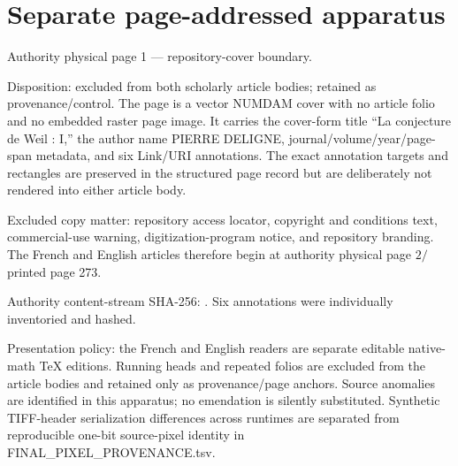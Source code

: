 \documentclass[10pt,leqno]{article}
\begin{document}
\section*{Separate page-addressed apparatus}

\label{physical-1}\par\smallskip

\noindent Authority physical page 1 — repository-cover boundary.\par

\noindent Disposition: excluded from both scholarly article bodies; retained as provenance/control. The page is a vector NUMDAM cover with no article folio and no embedded raster page image. It carries the cover-form title “La conjecture de Weil : \(\mathrm{I}\),” the author name PIERRE DELIGNE, journal/volume/year/page-span metadata, and six Link/URI annotations. The exact annotation targets and rectangles are preserved in the structured page record but are deliberately not rendered into either article body.\par

\noindent Excluded copy matter: repository access locator, copyright and conditions text, commercial-use warning, digitization-program notice, and repository branding. The French and English articles therefore begin at authority physical page \(2 /\) printed page 273.\par

\noindent Authority content-stream SHA-256: . Six annotations were individually inventoried and hashed.\par

\noindent Presentation policy: the French and English readers are separate editable native-math TeX editions. Running heads and repeated folios are excluded from the article bodies and retained only as provenance/page anchors. Source anomalies are identified in this apparatus; no emendation is silently substituted. Synthetic TIFF-header serialization differences across runtimes are separated from reproducible one-bit source-pixel identity in FINAL\_PIXEL\_PROVENANCE.tsv.\par

\clearpage

\label{physical-2}\par\smallskip
\end{document}
